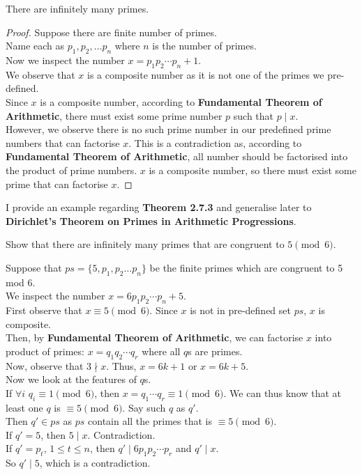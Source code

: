 \begin{theorem}
There are infinitely many primes.
\end{theorem}

\begin{proof}
  Suppose there are finite number of primes. \\
  Name each as $p_{1}, p_{2},\dots p_{n}$ where $n$ is the number of primes. \\
  Now we inspect the number $x = p_{1}p_{2}\cdots p_{n} + 1$. \\
  We observe that $x$ is a composite number as it is not one of the primes we pre-defined. \\
  Since $x$ is a composite number, according to \textbf{Fundamental Theorem of Arithmetic}, there must exist some prime number $p$ such that $p\mid x$. \\
  However, we observe there is no such prime number in our predefined prime numbers that can factorise $x$. This is a contradiction as, according to \textbf{Fundamental Theorem of Arithmetic}, all number should be factorised into the product of prime numbers. $x$ is a composite number, so there must exist some prime that can factorise $x$.
\end{proof}

\noindent
I provide an example regarding \textbf{Theorem 2.7.3} and generalise later to \textbf{Dirichlet's Theorem on Primes in Arithmetic Progressions}. 

\begin{exercise}
Show that there are infinitely many primes that are congruent to $5 \pmod{6}$.
\end{exercise}

\begin{solution}
Suppose that $ps = \{5, p_{1}, p_{2}\dots p_{n}\}$ be the finite primes which are congruent to 5 mod 6. \\
We inspect the number $x = 6p_{1}p_{2}\cdots p_{n} + 5$. \\ 
First observe that $x\equiv 5 \pmod{6}$. Since $x$ is not in pre-defined set $ps$, $x$ is composite. \\
Then, by \textbf{Fundamental Theorem of Arithmetic}, we can factorise $x$ into product of primes: $x = q_{1}q_{2}\cdots q_{r}$ where all $q$s are primes. \\
Now, observe that $3\nmid x$. Thus, $x = 6k + 1$ or $x = 6k + 5$. \\
Now we look at the features of $q$s. \\
If $\forall i$ $q_{i}\equiv 1 \pmod{6}$, then $x = q_{1}\cdots q_{r}\equiv 1 \pmod{6}$. We can thus know that at least one $q$ is $\equiv 5 \pmod{6}$. Say such $q$ as $q'$. \\
Then $q'\in ps$ as $ps$ contain all the primes that is $\equiv 5 \pmod{6}$. \\
If $q' = 5$, then $5\mid x$. Contradiction. \\
If $q' = p_{t}$, $1\leq t\leq n$, then $q'\mid 6p_{1}p_{2}\cdots p_{r}$ and $q'\mid x$. \\
So $q'\mid 5$, which is a contradiction.
\end{solution}


